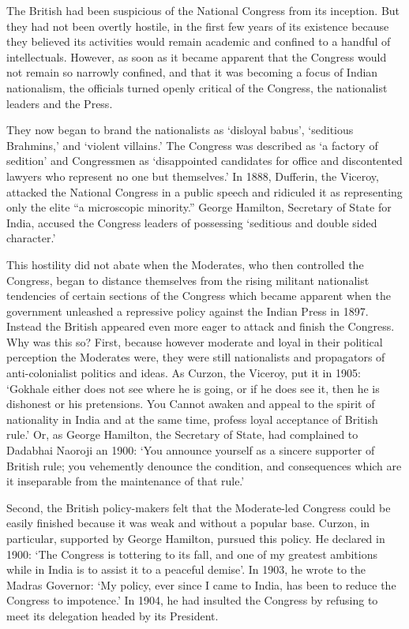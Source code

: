 \begin{multicols}{2}
The British had been suspicious of the National Congress from its inception. But they had not been overtly hostile, in the first few years of its existence because they believed its activities would remain academic and confined to a handful of intellectuals. However, as soon as it became apparent that the Congress would not remain so narrowly confined, and that it was becoming a focus of Indian nationalism, the officials turned openly critical of the Congress, the nationalist leaders and the Press.

They now began to brand the nationalists as `disloyal babus', `seditious Brahmins,' and `violent villains.' The Congress was described as `a factory of sedition' and Congressmen as `disappointed candidates for office and discontented lawyers who represent no one but themselves.' In 1888, Dufferin, the Viceroy, attacked the National Congress in a public speech and ridiculed it as representing only the elite ``a microscopic minority.'' George Hamilton, Secretary of State for India, accused the Congress leaders of possessing `seditious and double sided character.'

This hostility did not abate when the Moderates, who then controlled the Congress, began to distance themselves from the rising militant nationalist tendencies of certain sections of the Congress which became apparent when the government unleashed a repressive policy against the Indian Press in 1897. Instead the British appeared even more eager to attack and finish the Congress. Why was this so? First, because however moderate and loyal in their political perception the Moderates were, they were still nationalists and propagators of anti-colonialist politics and ideas. As Curzon, the Viceroy, put it in 1905: `Gokhale either does not see where he is going, or if he does see it, then he is dishonest or his pretensions. You Cannot awaken and appeal to the spirit of nationality in India and at the same time, profess loyal acceptance of British rule.' Or, as George Hamilton, the Secretary of State, had complained to Dadabhai Naoroji an 1900: `You announce yourself as a sincere supporter of British rule; you vehemently denounce the condition, and consequences which are it inseparable from the maintenance of that rule.'

Second, the British policy-makers felt that the Moderate-led Congress could be easily finished because it was weak and without a popular base. Curzon, in particular, supported by George Hamilton, pursued this policy. He declared in 1900: `The Congress is tottering to its fall, and one of my greatest ambitions while in India is to assist it to a peaceful demise'. In 1903, he wrote to the Madras Governor: `My policy, ever since I came to India, has been to reduce the Congress to impotence.' In 1904, he had insulted the Congress by refusing to meet its delegation headed by its President.


\end{multicols}
